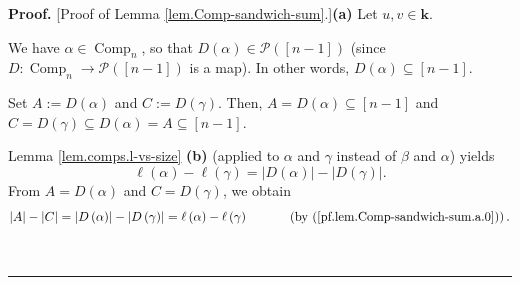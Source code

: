 \documentclass[numbers=enddot,12pt,final,onecolumn,notitlepage]{scrartcl}%
\theoremstyle{definition}
\newenvironment{proof}[1][Proof]{\noindent\textbf{#1.} }{\ \rule{0.5em}{0.5em}}
\newenvironment{verlong}{}{}
\begin{document}
\begin{verlong}


\begin{proof}
[Proof of Lemma \ref{lem.Comp-sandwich-sum}.]\textbf{(a)} Let $u,v\in
\mathbf{k}$.

We have $\alpha\in\operatorname*{Comp}\nolimits_{n}$, so that $D\left(
\alpha\right)  \in\mathcal{P}\left(  \left[  n-1\right]  \right)  $ (since
$D:\operatorname*{Comp}\nolimits_{n}\rightarrow\mathcal{P}\left(  \left[
n-1\right]  \right)  $ is a map). In other words, $D\left(  \alpha\right)
\subseteq\left[  n-1\right]  $.

Set $A:=D\left(  \alpha\right)  $ and $C:=D\left(  \gamma\right)  $. Then,
$A=D\left(  \alpha\right)  \subseteq\left[  n-1\right]  $ and $C=D\left(
\gamma\right)  \subseteq D\left(  \alpha\right)  =A\subseteq\left[
n-1\right]  $.

Lemma \ref{lem.comps.l-vs-size} \textbf{(b)} (applied to $\alpha$ and $\gamma$
instead of $\beta$ and $\alpha$) yields
\begin{equation}
\ell\left(  \alpha\right)  -\ell\left(  \gamma\right)  =\left\vert D\left(
\alpha\right)  \right\vert -\left\vert D\left(  \gamma\right)  \right\vert .
\label{pf.lem.Comp-sandwich-sum.a.0}%
\end{equation}
From $A=D\left(  \alpha\right)  $ and $C=D\left(  \gamma\right)  $, we obtain%
\[
\left\vert A\right\vert -\left\vert C\right\vert =\left\vert D\left(
\alpha\right)  \right\vert -\left\vert D\left(  \gamma\right)  \right\vert
=\ell\left(  \alpha\right)  -\ell\left(  \gamma\right)
\ \ \ \ \ \ \ \ \ \ \left(  \text{by (\ref{pf.lem.Comp-sandwich-sum.a.0}%
)}\right)  .
\]



\end{proof}
\end{verlong}
\end{document}
